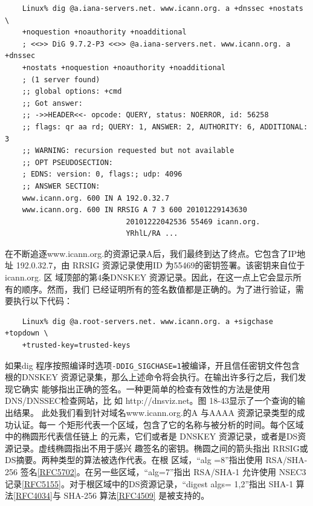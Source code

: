 \begin{verbatim}
    Linux% dig @a.iana-servers.net. www.icann.org. a +dnssec +nostats \
    +noquestion +noauthority +noadditional
    ; <<>> DiG 9.7.2-P3 <<>> @a.iana-servers.net. www.icann.org. a +dnssec
    +nostats +noquestion +noauthority +noadditional
    ; (1 server found)
    ;; global options: +cmd
    ;; Got answer:
    ;; ->>HEADER<<- opcode: QUERY, status: NOERROR, id: 56258
    ;; flags: qr aa rd; QUERY: 1, ANSWER: 2, AUTHORITY: 6, ADDITIONAL: 3
    ;; WARNING: recursion requested but not available
    ;; OPT PSEUDOSECTION:
    ; EDNS: version: 0, flags:; udp: 4096
    ;; ANSWER SECTION:
    www.icann.org. 600 IN A 192.0.32.7
    www.icann.org. 600 IN RRSIG A 7 3 600 20101229143630
                            20101222042536 55469 icann.org.
                            YRhlL/RA ...

\end{verbatim}
在不断追逐www.icann.org.的资源记录A后，我们最终到达了终点。它包含了IP地址
192.0.32.7，由 RRSIG 资源记录使用ID 为55469的密钥签署。该密钥来自位于 icann.org. 区
域顶部的第4条DNSKEY 资源记录。因此，在这一点上它会显示所有的顺序。然而，我们
已经证明所有的签名数值都是正确的。为了进行验证，需要执行以下代码：
\begin{verbatim}
    Linux% dig @a.root-servers.net. www.icann.org. a +sigchase +topdown \
    +trusted-key=trusted-keys
\end{verbatim}
如果dig 程序按照编译时选项\verb|-DDIG_SIGCHASE=1|被编译，开且信任密钥文件包含
根的DNSKEY 资源记录集，那么上述命令将会执行。在输出许多行之后，我们发现它确实
能够指出正确的签名。一种更简单的检查有效性的方法是使用 DNS/DNSSEC检查网站，比
如 http://dnsviz.net。图 18-43显示了一个查询的输出结果。
此处我们看到针对域名www.icann.org.的A 与AAAA 资源记录类型的成功认证。每一
个矩形代表一个区域，包含了它的名称与被分析的时间。每个区域中的椭圆形代表信任链上
的元素，它们或者是 DNSKEY 资源记录，或者是DS资源记录。虚线椭圆指出不用于感兴
趣签名的密钥。椭圆之间的箭头指出 RRSIG或DS摘要。两种类型的算法被选作代表。在根
区域，“alg =8”指出使用 RSA/SHA-256 签名\href{https://www.rfc-editor.org/rfc/rfc5702}{[RFC5702]}。在另一些区域，“alg=7”指出
RSA/SHA-1 允许使用 NSEC3记录\href{https://www.rfc-editor.org/rfc/rfc5155}{[RFC5155]}。对于根区域中的DS资源记录，“digest algs=
1,2”指出 SHA-1 算法\href{https://www.rfc-editor.org/rfc/rfc4034}{[RFC4034]}与 SHA-256 算法\href{https://www.rfc-editor.org/rfc/rfc4509}{[RFC4509]} 是被支持的。

